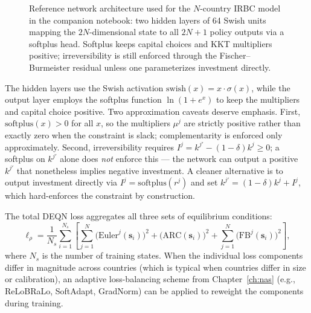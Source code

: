 \documentclass[11pt,a4paper]{report}
\begin{document}
\begin{figure}[ht]
\centering
{}
\caption{Reference network architecture used for the $N$-country IRBC model in the companion notebook: two hidden layers of 64 Swish units mapping the $2N$-dimensional state to all $2N+1$ policy outputs via a softplus head.  Softplus keeps capital choices and KKT multipliers positive; irreversibility is still enforced through the Fischer--Burmeister residual unless one parameterizes investment directly.}
\label{fig:irbc_nn_arch}
\end{figure}

The hidden layers use the Swish activation $\mathrm{swish}(x) = x \cdot \sigma(x)$, while the output layer employs the softplus function $\ln(1+e^x)$ to keep the multipliers and capital choice positive.  Two approximation caveats deserve emphasis.  First, $\mathrm{softplus}(x) > 0$ for all $x$, so the multipliers $\mu^j$ are strictly positive rather than exactly zero when the constraint is slack; complementarity is enforced only approximately.  Second, irreversibility requires $I^j = k^{j\prime} - (1-\delta)k^j \geq 0$; a softplus on $k^{j\prime}$ alone does \emph{not} enforce this — the network can output a positive $k^{j\prime}$ that nonetheless implies negative investment.  A cleaner alternative is to output investment directly via $I^j = \mathrm{softplus}(r^j)$ and set $k^{j\prime} = (1-\delta)k^j + I^j$, which hard-enforces the constraint by construction.

The total DEQN loss aggregates all three sets of equilibrium conditions:
\begin{equation}
\ell_\rho = \frac{1}{N_s} \sum_{i=1}^{N_s} \left[
\sum_{j=1}^{N} \bigl(\mathrm{Euler}^j(\bm{s}_i)\bigr)^2
+ \bigl(\mathrm{ARC}(\bm{s}_i)\bigr)^2
+ \sum_{j=1}^{N} \bigl(\mathrm{FB}^j(\bm{s}_i)\bigr)^2
\right],
\label{eq:irbc_loss}
\end{equation}
where $N_s$ is the number of training states.  When the individual loss components differ in magnitude across countries (which is typical when countries differ in size or calibration), an adaptive loss-balancing scheme from Chapter~\ref{ch:nas} (e.g., ReLoBRaLo, SoftAdapt, GradNorm) can be applied to reweight the components during training.
\end{document}
